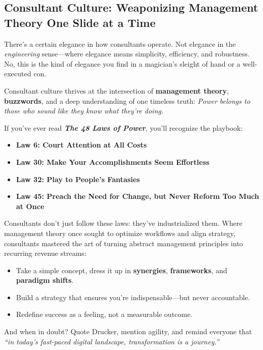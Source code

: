 \subsection{Consultant Culture: Weaponizing Management Theory One Slide at a Time}

There’s a certain elegance in how consultants operate.  Not elegance in the \textit{engineering} sense—where elegance means simplicity, efficiency, and robustness.  No, this is the kind of elegance you find in a magician’s sleight of hand or a well-executed con.

Consultant culture thrives at the intersection of \textbf{management theory}, \textbf{buzzwords}, and a deep understanding of one timeless truth:  \textit{Power belongs to those who sound like they know what they’re doing.}

If you’ve ever read \textbf{\textit{The 48 Laws of Power}}, you’ll recognize the playbook:

\begin{itemize}
  \item \textbf{Law 6: Court Attention at All Costs}
  \item \textbf{Law 30: Make Your Accomplishments Seem Effortless}
  \item \textbf{Law 32: Play to People's Fantasies}
  \item \textbf{Law 45: Preach the Need for Change, but Never Reform Too Much at Once}
\end{itemize}

Consultants don’t just follow these laws: they’ve industrialized them.  Where management theory once sought to optimize workflows and align strategy, consultants mastered the art of turning abstract management principles into recurring revenue streams:

\begin{itemize}
  \item Take a simple concept, dress it up in \textbf{synergies}, \textbf{frameworks}, and \textbf{paradigm shifts}.
  \item Build a strategy that ensures you're indispensable—but never accountable.
  \item Redefine success as a feeling, not a measurable outcome.
\end{itemize}

And when in doubt? Quote Drucker, mention agility, and remind everyone that \textit{``in today’s fast-paced digital landscape, transformation is a journey.''}


